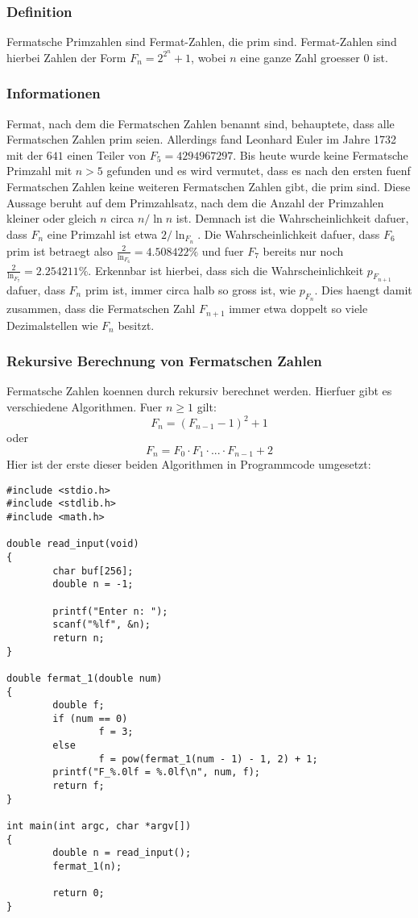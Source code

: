 \subsubsection{Definition}
Fermatsche Primzahlen sind Fermat-Zahlen, die prim sind. Fermat-Zahlen sind hierbei Zahlen der Form $F_n = 2^{2^n} + 1$, wobei $n$ eine ganze Zahl groesser $0$ ist.
\subsubsection{Informationen}
Fermat, nach dem die Fermatschen Zahlen benannt sind, behauptete, dass alle Fermatschen Zahlen prim seien. Allerdings fand Leonhard Euler im Jahre 1732 mit der $641$ einen Teiler von $F_5=4294967297$. Bis heute wurde keine Fermatsche Primzahl mit $n > 5$ gefunden und es wird vermutet, dass es nach den ersten fuenf Fermatschen Zahlen keine weiteren Fermatschen Zahlen gibt, die prim sind. Diese Aussage beruht auf dem Primzahlsatz, nach dem die Anzahl der Primzahlen kleiner oder gleich $n$ circa $n / \ln n$ ist. Demnach ist die Wahrscheinlichkeit dafuer, dass $F_n$ eine Primzahl ist etwa $2 / \ln_{F_n}$. Die Wahrscheinlichkeit dafuer, dass $F_6$ prim ist betraegt also $\frac{2}{\ln_{F_6}} = 4.508422\%$ und fuer $F_7$ bereits nur noch $\frac{2}{\ln_{F_7}} = 2.254211\%$. Erkennbar ist hierbei, dass sich die Wahrscheinlichkeit $p_{F_{n+1}}$ dafuer, dass $F_n$ prim ist, immer circa halb so gross ist, wie $p_{F_{n}}$. Dies haengt damit zusammen, dass die Fermatschen Zahl $F_{n+1}$ immer etwa doppelt so viele Dezimalstellen wie $F_{n}$ besitzt.
\subsubsection{Rekursive Berechnung von Fermatschen Zahlen}
Fermatsche Zahlen koennen durch rekursiv berechnet werden. Hierfuer gibt es verschiedene Algorithmen.
Fuer $n \ge 1$ gilt:
\begin{equation}
F_n = (F_{n - 1} - 1 )^2 + 1
\end{equation}
oder
\begin{equation}
F_n = F_0 \cdot F_1 \cdot ... \cdot F_{n-1} + 2
\end{equation}
Hier ist der erste dieser beiden Algorithmen in Programmcode umgesetzt:
\lstset{language=C}
\begin{lstlisting}[frame=single]
#include <stdio.h>
#include <stdlib.h>
#include <math.h>

double read_input(void)
{
        char buf[256];
        double n = -1;

        printf("Enter n: ");
        scanf("%lf", &n);
        return n;
}

double fermat_1(double num)
{
        double f;
        if (num == 0)
                f = 3;
        else
                f = pow(fermat_1(num - 1) - 1, 2) + 1;
        printf("F_%.0lf = %.0lf\n", num, f);
        return f;
}

int main(int argc, char *argv[])
{
        double n = read_input();
        fermat_1(n);

        return 0;
}
\end{lstlisting}

